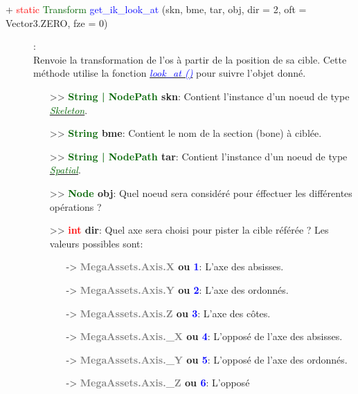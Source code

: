 \documentclass[a4paper, 11pt]{article}
\begin{document}
	\begin{description}
		\item [+ \textcolor{red}{static} \textcolor{darkgreen}{Transform} \textcolor{blue}
		{get\_ik\_look\_at} (skn, bme, tar, obj, dir = 2, oft = Vector3.ZERO, fze = 0)]: \\Renvoie la 
		transformation de l'os à partir de la position de sa cible. Cette méthode utilise la fonction
		\href{https://docs.godotengine.org/fr/stable/classes/class_spatial.html#class-spatial-method-look-at}{\textit{\textcolor{blue}{look\_at ()}}} pour suivre l'objet donné.
		\begin{itemize}
			\item[>> \textbf{\textcolor{darkgreen}{String | NodePath} skn}:] Contient l'instance d'un noeud 
			de type \href{https://docs.godotengine.org/fr/stable/classes/class_skeleton.html}
			{\textit{\textcolor{darkgreen}{Skeleton}}}.
			\item[>> \textbf{\textcolor{darkgreen}{String} bme}:] Contient le nom de la section (bone) à 
			ciblée.
			\item[>> \textbf{\textcolor{darkgreen}{String | NodePath} tar}:] Contient l'instance d'un noeud
			de type \href{https://docs.godotengine.org/fr/stable/classes/class_spatial.html}
			{\textit{\textcolor{darkgreen}{Spatial}}}.
			\item [>> \textbf{\textcolor{darkgreen}{Node} obj}:] Quel noeud sera considéré pour éffectuer 
			les différentes opérations ?
			\item[>> \textbf{\textcolor{red}{int} dir}:] Quel axe sera choisi pour pister la cible référée ?
			Les valeurs possibles sont:
			\begin{itemize}
				\item [-> \textbf{\textcolor{gray}{MegaAssets.Axis.X} ou \textcolor{blue}{1}}:] L'axe des 
				absisses.
				\item [-> \textbf{\textcolor{gray}{MegaAssets.Axis.Y} ou \textcolor{blue}{2}}:] L'axe des 
				ordonnés.
				\item [-> \textbf{\textcolor{gray}{MegaAssets.Axis.Z} ou \textcolor{blue}{3}}:] L'axe des 
				côtes.
				\item [-> \textbf{\textcolor{gray}{MegaAssets.Axis.\_X} ou \textcolor{blue}{4}}:] L'opposé 
				de l'axe des absisses.
				\item [-> \textbf{\textcolor{gray}{MegaAssets.Axis.\_Y} ou \textcolor{blue}{5}}:] L'opposé 
				de l'axe des ordonnés.
				\item [-> \textbf{\textcolor{gray}{MegaAssets.Axis.\_Z} ou \textcolor{blue}{6}}:] L'opposé 

\end{itemize}
\end{itemize}
\end{description}
\end{document}
